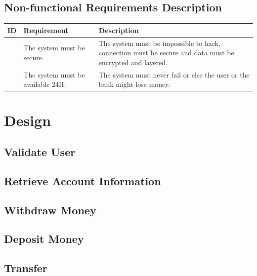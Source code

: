 \documentclass{article}
\newcounter{magicrownumbers}
\newcommand\rownumber{\stepcounter{magicrownumbers}\arabic{magicrownumbers}}
\begin{document}
	\newpage\subsection{Non-functional Requirements Description}
	\setcounter{magicrownumbers}{0}
	\def\arraystretch{2}
	\begin{table}[h!]
		\begin{center}
			\begin{tabularx}{\textwidth}{r|X|X}
				\textbf{ID} & 
				\textbf{Requirement} & 
				\textbf{Description}\\
				\hline
				\rownumber &
				The system must be secure. &
				The system must be impossible to hack, connection must be secure and data must be encrypted and layered.
				\\
				\hline

				\rownumber &
				The system must be available 24H. &
				The system must never fail or else the user or the bank might lose money.
				\\
			
			\end{tabularx}
		\end{center}
	\end{table}

	\section{Design}
	\newpage\subsection{Validate User}
	\newpage\subsection{Retrieve Account Information}
	\newpage\subsection{Withdraw Money}
	\newpage\subsection{Deposit Money}
	\newpage\subsection{Transfer}
\end{document}
